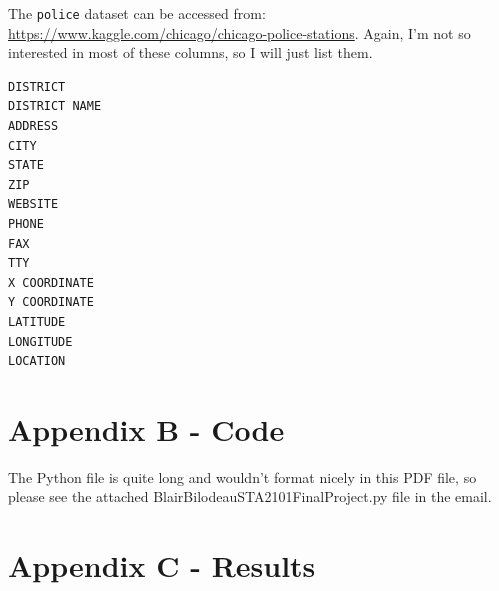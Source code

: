 \documentclass[11pt]{article}
\newcommand{\1}{\mathds{1}}
\def\code#1{\texttt{#1}}
\begin{document}
\noindent
The \code{police} dataset can be accessed from:
\href{https://www.kaggle.com/chicago/chicago-police-stations}{https://www.kaggle.com/chicago/chicago-police-stations}. Again, I'm not so interested in most of these columns, so I will just list them.

\begin{Verbatim}[fontsize=\small]
DISTRICT
DISTRICT NAME
ADDRESS
CITY
STATE
ZIP
WEBSITE
PHONE
FAX
TTY
X COORDINATE
Y COORDINATE
LATITUDE
LONGITUDE
LOCATION
\end{Verbatim}

\section*{Appendix B - Code}
The Python file is quite long and wouldn't format nicely in this PDF file, so please see the attached BlairBilodeauSTA2101FinalProject.py file in the email.

\newpage
\section*{Appendix C - Results}
\end{document}
